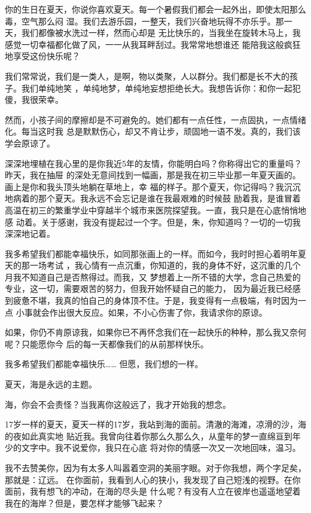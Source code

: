 \documentclass[12pt,a4paper]{article}
\begin{document}
		你的生日在夏天，你说你喜欢夏天。每一个暑假我们都会一起外出，即使太阳那么毒，空气那么闷
	湿。我们去游乐园，一整天，我们兴奋地玩得不亦乐乎。那一天，我们都像被水洗过一样，然而心却是
	无比快乐的，当我坐在旋转木马上，我感觉一切幸福都化做了风，一一从我耳畔刮过。我常常地想谁还
	能陪我这般疯狂地享受这份快乐呢？

		我们常常说，我们是一类人，是啊，物以类聚，人以群分。我们都是长不大的孩子。我们单纯地笑
	，单纯地梦，单纯地妄想拒绝长大。我想告诉你：和你一起犯傻，我很荣幸。

		然而，小孩子间的摩擦却是不可避免的。她们都有一点任性，一点固执，一点情绪化。每当这时我
	总是默默伤心，却又不肯让步，顽固地一语不发。真的，我们该学会原谅了。

		深深地埋植在我心里的是你我近5年的友情，你能明白吗？你称得出它的重量吗？昨天，我在抽屉
	的深处无意间找到一幅画，那是我在初三毕业那一年夏天画的。画上是你和我头顶头地躺在草地上，幸
	福的样子。那个夏天，你记得吗？我沉沉地病着的那个夏天。我永远不会忘记是谁在我最艰难的时候鼓
	励着我，是谁冒着高温在初三的繁重学业中穿越半个城市来医院探望我。一直，我只是在心底悄悄地感
	动着。关于感谢，我没有提起过一个字。但是，朱，你知道吗？一切的一切我深深地记着。

		我多希望我们都能幸福快乐，如同那张画上的一样。而如今，我时时担心着明年夏天的那一场考试
	，我心情有一点沉重，你知道的，我的身体不好，这沉重的几个月我不知道自己是否熬得过。而我，又
	梦想着上一所不错的大学，念自己热爱的专业，这一切，需要艰苦的努力，但我开始怀疑自己的能力，
	因为最近我已经感到疲惫不堪，我真的怕自己的身体顶不住。于是，我变得有一点极端，有时因为一点
	小事就会作出很大反应。如果，不小心伤害了你，我请求你的原谅。

		如果，你仍不肯原谅我，如果你已不再怀念我们在一起快乐的种种，那么我又奈何呢？只能愿你今
	后的每一天都像我们的从前那样快乐。

		我多希望我们都能幸福快乐…… 但愿，我们想的一样。

	\endwriting



		夏天，海是永远的主题。

		海，你会不会责怪？当我离你这般远了，我才开始我的想念。

		17岁一样的夏天，夏天一样的17岁，我站到海的面前。清澈的海滩，凉滑的沙，海的夜如此真实地
	贴近我。我曾向往着你那么久那么久，从童年的梦一直绵亘到年少的文字中。我不说爱你，我只在心底
	将对你的情感一次又一次地回味，温习。

		我不去赞美你，因为有太多人叫嚣着空洞的美丽字眼。对于你我想，两个字足矣，那就是：辽远。
	在你面前，我看到人心的狭小，我发现了自己短浅的视野。在你面前，我有想飞的冲动，在海的尽头是
	什么呢？有没有人立在彼岸也遥遥地望着我在的海岸？但是，要怎样才能够飞起来？
\end{document}
